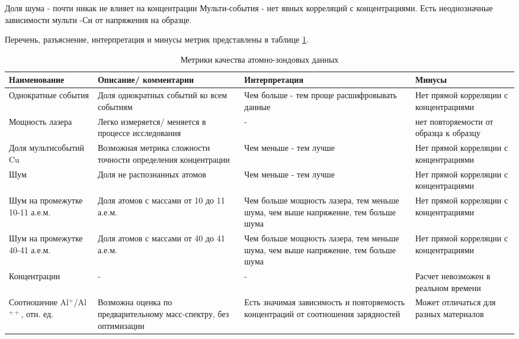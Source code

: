 Доля шума - почти никак не влияет на концентрации
Мульти-события - нет явных корреляций с концентрациями. Есть неоднозначные зависимости мульти -Си от напряжения на образце.

Перечень, разъяснение, интерпретация и минусы метрик представлены в таблице \cref{tab:params_expl}.

\begin{table} [htbp]
	\centering
	\caption{Метрики качества атомно-зондовых данных}
	\label{tab:params_expl}
	\begin{SingleSpace}
		\begin{tabularx}{\textwidth} {| X | X | X | X |}
			\hline
			Наименование & Описание/ комментарии & Интерпретация & Минусы  \\ \hline
			Однократные события & {Доля однократных событий ко всем событиям}  & {Чем больше - тем проще расшифровывать данные}  & {Нет прямой корреляции с концентрациями}              \\ \hline
			Мощность лазера & {Легко измеряется/ меняется в процессе исследования}  & {-}  & {нет повторяемости от образца к образцу}              \\ \hline
			Доля мультисобытий Cu & Возможная метрика сложности точности определения концентрации & Чем меньше - тем лучше & Нет прямой корреляции с концентрациями               \\ \hline
			Шум         & Доля не распознанных атомов  & Чем меньше - тем лучше  & Нет прямой корреляции с концентрациями                \\ \hline
			Шум на промежутке 10-11 а.е.м.      & Доля атомов с массами от 10 до 11 а.е.м. & Чем больше мощность лазера, тем меньше шума, чем выше напряжение, тем больше шума  & Нет прямой корреляции с концентрациями               \\ \hline
			Шум на промежутке 40-41 а.е.м.      & Доля атомов с массами от 40 до 41 а.е.м. & Чем больше мощность лазера, тем меньше шума, чем выше напряжение, тем больше шума  & Нет прямой корреляции с концентрациями             \\ \hline
			Концентрации  & -   &  -   & Расчет невозможен в реальном времени  \\ \hline			
			Соотношение Al$^+$/Al$^{++}$, отн. ед.    & Возможна оценка по предварительному масс-спектру, без оптимизации   & Есть значимая зависимость и повторяемость концентраций от соотношения зарядностей  & Может отличаться для разных материалов   \\ \hline
		\end{tabularx}
	\end{SingleSpace}
\end{table}

